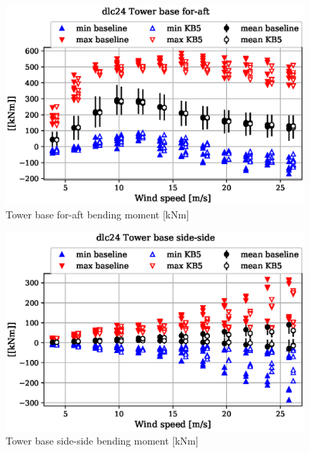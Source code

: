 \begin{figure}[!ht]
\begin{center}
	\includegraphics[width=.85\linewidth]{figures/baseline-vs-KB6/dlc24/tower-tower-node-001-momentvec-x_AA0007_AA0003.eps}
\end{center}
\caption{Tower base for-aft bending moment [kNm]}
\label{fig:baseline-vs-KB6:dlc24:tower-base-fa}
\end{figure}

\begin{figure}[!ht]
\begin{center}
	\includegraphics[width=.85\linewidth]{figures/baseline-vs-KB6/dlc24/tower-tower-node-001-momentvec-y_AA0007_AA0003.eps}
\end{center}
\caption{Tower base side-side bending moment [kNm]}
\label{fig:baseline-vs-KB6:dlc24:tower-base-ss}
\end{figure}


